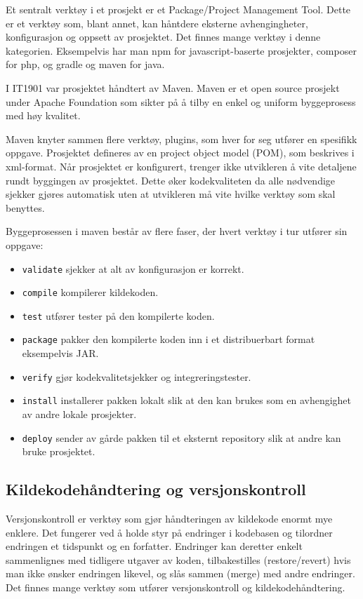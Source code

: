 \documentclass[12pt,a4paper]{article}
\begin{document}
Et sentralt verktøy i et prosjekt er et Package/Project Management Tool.
Dette er et verktøy som, blant annet, kan håntdere eksterne
avhengingheter, konfigurasjon og oppsett av prosjektet. Det finnes mange
verktøy i denne kategorien. Eksempelvis har man npm for
javascript-baserte prosjekter, composer for php, og gradle og maven for
java.

I IT1901 var prosjektet håndtert av Maven. Maven er et open source
prosjekt under Apache Foundation som sikter på å tilby en enkel og
uniform byggeprosess med høy kvalitet.\cite{maven}

Maven knyter sammen flere verktøy, plugins, som hver for seg utfører en
spesifikk oppgave. Prosjektet defineres av en project object model
(POM), som beskrives i xml-format. Når prosjektet er konfigurert,
trenger ikke utvikleren å vite detaljene rundt byggingen av prosjektet.
Dette øker kodekvaliteten da alle nødvendige sjekker gjøres automatisk
uten at utvikleren må vite hvilke verktøy som skal benyttes.

Byggeprosessen i maven består av flere faser, der hvert verktøy i tur
utfører sin oppgave:

\begin{itemize}
\item
  \texttt{validate} sjekker at alt av konfigurasjon er korrekt.
\item
  \texttt{compile} kompilerer kildekoden.
\item
  \texttt{test} utfører tester på den kompilerte koden.
\item
  \texttt{package} pakker den kompilerte koden inn i et distribuerbart
  format eksempelvis JAR.
\item
  \texttt{verify} gjør kodekvalitetsjekker og integreringstester.
\item
  \texttt{install} installerer pakken lokalt slik at den kan brukes som
  en avhengighet av andre lokale prosjekter.
\item
  \texttt{deploy} sender av gårde pakken til et eksternt repository slik
  at andre kan bruke prosjektet.
\end{itemize}

\subsection*{Kildekodehåndtering og versjonskontroll}

Versjonskontroll er verktøy som gjør håndteringen av kildekode enormt
mye enklere. Det fungerer ved å holde styr på endringer i kodebasen og
tilordner endringen et tidspunkt og en forfatter. Endringer kan deretter
enkelt sammenlignes med tidligere utgaver av koden, tilbakestilles
(restore/revert) hvis man ikke ønsker endringen likevel, og slås sammen
(merge) med andre endringer. Det finnes mange verktøy som utfører
versjonskontroll og kildekodehåndtering.
\end{document}
